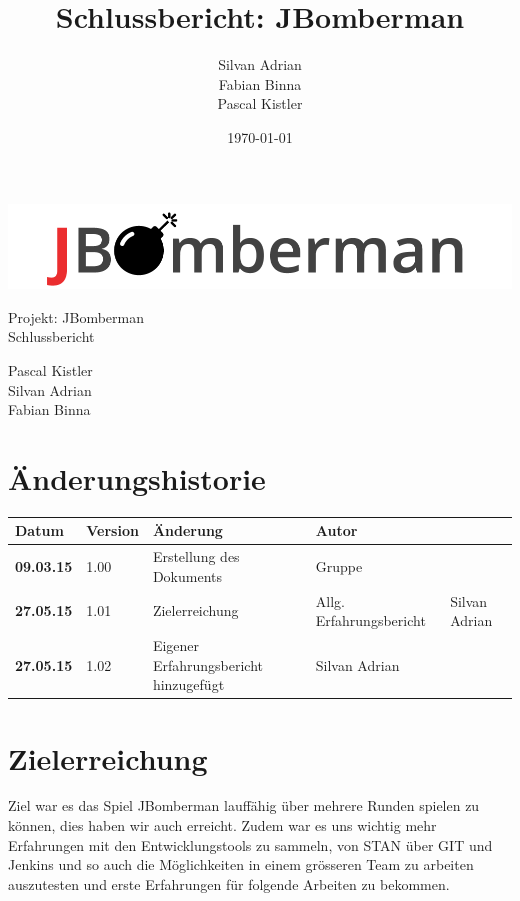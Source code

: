 \documentclass[11pt]{scrartcl}
\title{Schlussbericht: JBomberman}
\author{Silvan Adrian \\ Fabian Binna \\ Pascal Kistler}
\date{\today{}}
\begin{document}
\def\arraystretch{1.5}
\begin{titlepage}
\begin{center}
\vspace{10em}
\includegraphics[scale=2]{jbomberman}
\vspace{10em}
\end{center}
\begin{center}
\huge {Projekt: JBomberman} \\
\huge {Schlussbericht}
\end{center}
\begin{center}
\vspace{10em}
\LARGE {Pascal Kistler} \\
\LARGE {Silvan Adrian} \\
\LARGE {Fabian Binna}
\end{center}

\end{titlepage}

\newpage
\section{Änderungshistorie}
\label{sec:Änderungen}

\begin{tabularx}{\linewidth}{l l l l}
\textbf{Datum} & \textbf{Version} & \textbf{Änderung}  & \textbf{Autor} \\
\hline
\textbf{09.03.15} & 1.00 & Erstellung des Dokuments & Gruppe \\
\textbf{27.05.15} & 1.01 & Zielerreichung & Allg. Erfahrungsbericht & Silvan 
Adrian\\
\textbf{27.05.15} & 1.02 & Eigener Erfahrungsbericht hinzugefügt & Silvan 
Adrian\\
\end{tabularx}

\newpage
\tableofcontents
\newpage

\section{Zielerreichung}
Ziel war es das Spiel JBomberman lauffähig über mehrere Runden spielen zu 
können, dies haben wir auch erreicht.
Zudem war es uns wichtig mehr Erfahrungen mit den Entwicklungstools zu sammeln,
von STAN über GIT und Jenkins und so auch die Möglichkeiten 
in einem grösseren Team zu arbeiten auszutesten und erste Erfahrungen 
für folgende Arbeiten zu bekommen.
\end{document}

